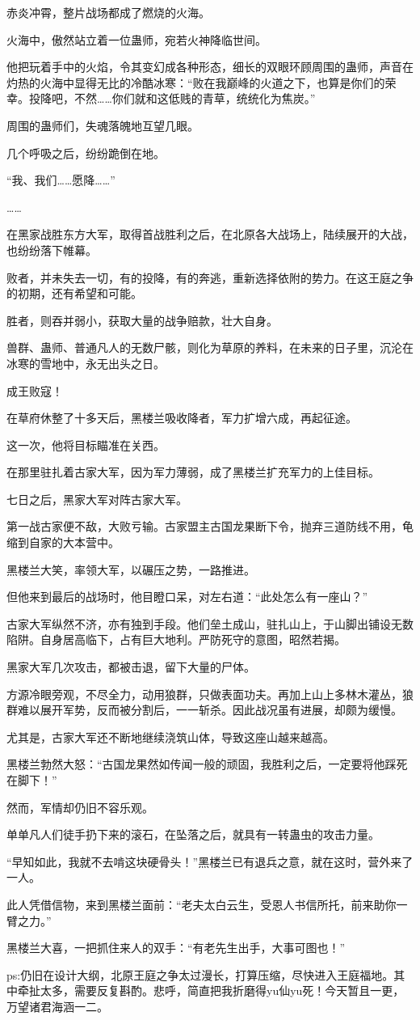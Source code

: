 \begin{this_body}
赤炎冲霄，整片战场都成了燃烧的火海。

火海中，傲然站立着一位蛊师，宛若火神降临世间。

他把玩着手中的火焰，令其变幻成各种形态，细长的双眼环顾周围的蛊师，声音在灼热的火海中显得无比的冷酷冰寒：“败在我巅峰的火道之下，也算是你们的荣幸。投降吧，不然……你们就和这低贱的青草，统统化为焦炭。”

周围的蛊师们，失魂落魄地互望几眼。

几个呼吸之后，纷纷跪倒在地。

“我、我们……愿降……”

……

在黑家战胜东方大军，取得首战胜利之后，在北原各大战场上，陆续展开的大战，也纷纷落下帷幕。

败者，并未失去一切，有的投降，有的奔逃，重新选择依附的势力。在这王庭之争的初期，还有希望和可能。

胜者，则吞并弱小，获取大量的战争赔款，壮大自身。

兽群、蛊师、普通凡人的无数尸骸，则化为草原的养料，在未来的日子里，沉沦在冰寒的雪地中，永无出头之日。

成王败寇！

在草府休整了十多天后，黑楼兰吸收降者，军力扩增六成，再起征途。

这一次，他将目标瞄准在关西。

在那里驻扎着古家大军，因为军力薄弱，成了黑楼兰扩充军力的上佳目标。

七日之后，黑家大军对阵古家大军。

第一战古家便不敌，大败亏输。古家盟主古国龙果断下令，抛弃三道防线不用，龟缩到自家的大本营中。

黑楼兰大笑，率领大军，以碾压之势，一路推进。

但他来到最后的战场时，他目瞪口呆，对左右道：“此处怎么有一座山？”

古家大军纵然不济，亦有独到手段。他们垒土成山，驻扎山上，于山脚出铺设无数陷阱。自身居高临下，占有巨大地利。严防死守的意图，昭然若揭。

黑家大军几次攻击，都被击退，留下大量的尸体。

方源冷眼旁观，不尽全力，动用狼群，只做表面功夫。再加上山上多林木灌丛，狼群难以展开军势，反而被分割后，一一斩杀。因此战况虽有进展，却颇为缓慢。

尤其是，古家大军还不断地继续浇筑山体，导致这座山越来越高。

黑楼兰勃然大怒：“古国龙果然如传闻一般的顽固，我胜利之后，一定要将他踩死在脚下！”

然而，军情却仍旧不容乐观。

单单凡人们徒手扔下来的滚石，在坠落之后，就具有一转蛊虫的攻击力量。

“早知如此，我就不去啃这块硬骨头！”黑楼兰已有退兵之意，就在这时，营外来了一人。

此人凭借信物，来到黑楼兰面前：“老夫太白云生，受恩人书信所托，前来助你一臂之力。”

黑楼兰大喜，一把抓住来人的双手：“有老先生出手，大事可图也！”

ps:仍旧在设计大纲，北原王庭之争太过漫长，打算压缩，尽快进入王庭福地。其中牵扯太多，需要反复斟酌。悲呼，简直把我折磨得yu仙yu死！今天暂且一更，万望诸君海涵一二。

\end{this_body}

